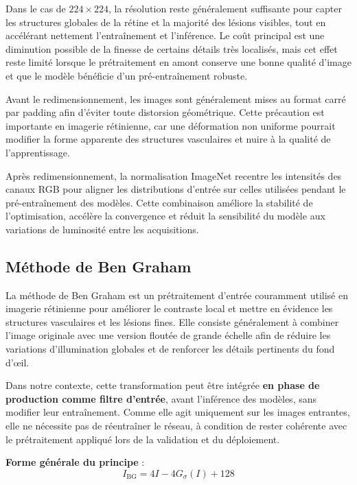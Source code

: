 \documentclass[12pt,a4paper,oneside]{report}
\begin{document}
Dans le cas de $224 \times 224$, la résolution reste généralement suffisante
pour capter les structures globales de la rétine et la majorité des lésions
visibles, tout en accélérant nettement l'entraînement et l'inférence. Le
coût principal est une diminution possible de la finesse de certains détails
très localisés, mais cet effet reste limité lorsque le prétraitement en amont
conserve une bonne qualité d'image et que le modèle bénéficie d'un
pré-entraînement robuste.

Avant le redimensionnement, les images sont généralement mises au format
carré par padding afin d'éviter toute distorsion géométrique. Cette précaution
est importante en imagerie rétinienne, car une déformation non uniforme
pourrait modifier la forme apparente des structures vasculaires et nuire à la
qualité de l'apprentissage.

Après redimensionnement, la normalisation ImageNet recentre les intensités
des canaux RGB pour aligner les distributions d'entrée sur celles utilisées
pendant le pré-entraînement des modèles. Cette combinaison améliore la
stabilité de l'optimisation, accélère la convergence et réduit la sensibilité
du modèle aux variations de luminosité entre les acquisitions.

\subsection{Méthode de Ben Graham}

La méthode de Ben Graham est un prétraitement d'entrée couramment utilisé
en imagerie rétinienne pour améliorer le contraste local et mettre en
évidence les structures vasculaires et les lésions fines. Elle consiste
généralement à combiner l'image originale avec une version floutée de
grande échelle afin de réduire les variations d'illumination globales et
de renforcer les détails pertinents du fond d'œil.

Dans notre contexte, cette transformation peut être intégrée \textbf{en
phase de production comme filtre d'entrée}, avant l'inférence des modèles,
sans modifier leur entraînement. Comme elle agit uniquement sur les images
entrantes, elle ne nécessite pas de réentraîner le réseau, à condition de
rester cohérente avec le prétraitement appliqué lors de la validation et du
déploiement.

\textbf{Forme générale du principe} :
\begin{equation}
I_{\text{BG}} = 4I - 4G_{\sigma}(I) + 128
\end{equation}
\end{document}
